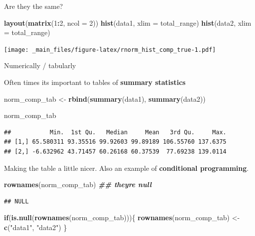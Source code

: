 \documentclass[
]{book}
\newenvironment{Shaded}{\begin{snugshade}}{\end{snugshade}}
\newcommand{\AttributeTok}[1]{\textcolor[rgb]{0.13,0.29,0.53}{#1}}
\newcommand{\ControlFlowTok}[1]{\textcolor[rgb]{0.13,0.29,0.53}{\textbf{#1}}}
\newcommand{\DecValTok}[1]{\textcolor[rgb]{0.00,0.00,0.81}{#1}}
\newcommand{\DocumentationTok}[1]{\textcolor[rgb]{0.56,0.35,0.01}{\textbf{\textit{#1}}}}
\newcommand{\FunctionTok}[1]{\textcolor[rgb]{0.13,0.29,0.53}{\textbf{#1}}}
\newcommand{\NormalTok}[1]{#1}
\newcommand{\OtherTok}[1]{\textcolor[rgb]{0.56,0.35,0.01}{#1}}
\newcommand{\SpecialCharTok}[1]{\textcolor[rgb]{0.81,0.36,0.00}{\textbf{#1}}}
\newcommand{\StringTok}[1]{\textcolor[rgb]{0.31,0.60,0.02}{#1}}
\begin{document}
Are they the same?

\begin{Shaded}
\begin{Highlighting}[]
\FunctionTok{layout}\NormalTok{(}\FunctionTok{matrix}\NormalTok{(}\DecValTok{1}\SpecialCharTok{:}\DecValTok{2}\NormalTok{, }\AttributeTok{ncol =} \DecValTok{2}\NormalTok{))}
\FunctionTok{hist}\NormalTok{(data1, }\AttributeTok{xlim =}\NormalTok{ total\_range)}
\FunctionTok{hist}\NormalTok{(data2, }\AttributeTok{xlim =}\NormalTok{ total\_range)}
\end{Highlighting}
\end{Shaded}

\texttt{[image: \_main\_files/figure-latex/rnorm\_hist\_comp\_true-1.pdf]}

Numerically / tabularly

Often times its important to tables of \textbf{summary statistics}

\begin{Shaded}
\begin{Highlighting}[]
\NormalTok{norm\_comp\_tab }\OtherTok{\textless{}{-}} \FunctionTok{rbind}\NormalTok{(}\FunctionTok{summary}\NormalTok{(data1),}
                       \FunctionTok{summary}\NormalTok{(data2))}

\NormalTok{norm\_comp\_tab}
\end{Highlighting}
\end{Shaded}

\begin{verbatim}
##           Min.  1st Qu.   Median     Mean   3rd Qu.     Max.
## [1,] 65.580311 93.35516 99.92603 99.89189 106.55760 137.6375
## [2,] -6.632962 43.71457 60.26168 60.37539  77.69238 139.0114
\end{verbatim}

Making the table a little nicer. Also an example of \textbf{conditional programming}.

\begin{Shaded}
\begin{Highlighting}[]
\FunctionTok{rownames}\NormalTok{(norm\_comp\_tab) }\DocumentationTok{\#\# they\textquotesingle{}re null}
\end{Highlighting}
\end{Shaded}

\begin{verbatim}
## NULL
\end{verbatim}

\begin{Shaded}
\begin{Highlighting}[]
\ControlFlowTok{if}\NormalTok{(}\FunctionTok{is.null}\NormalTok{(}\FunctionTok{rownames}\NormalTok{(norm\_comp\_tab)))\{}
  \FunctionTok{rownames}\NormalTok{(norm\_comp\_tab) }\OtherTok{\textless{}{-}} \FunctionTok{c}\NormalTok{(}\StringTok{"data1"}\NormalTok{, }\StringTok{"data2"}\NormalTok{)}
\NormalTok{\}}
\end{Highlighting}
\end{Shaded}
\end{document}
